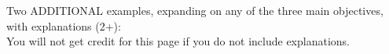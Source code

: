 \documentclass{article}
\theoremstyle{plain}
\theoremstyle{definition}
\theoremstyle{remark}
\begin{document}
\newpage
%

\large \noindent Two ADDITIONAL examples, expanding on any of the three main objectives, with explanations (2+):\\
You will not get credit for this page if you do not include explanations.
\end{document}
